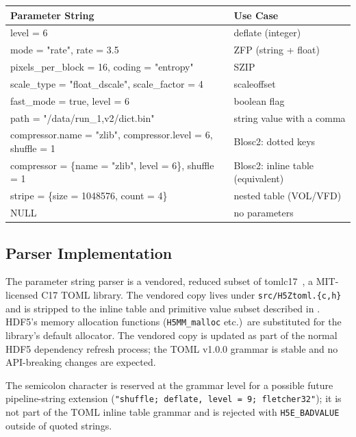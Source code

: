 \documentclass[../RFC-HDFG-2026-001.tex]{subfiles}
\begin{document}
\begin{center}
\begin{tabularx}{\textwidth}{>{\ttfamily\raggedright\arraybackslash\hsize=1.55\hsize}X
                             >{\raggedright\arraybackslash\hsize=0.45\hsize}X}
\toprule
\textbf{Parameter String} & \textbf{Use Case} \\
\midrule
level = 6 & deflate (integer) \\
mode = "rate", rate = 3.5 & ZFP (string + float) \\
pixels\_per\_block = 16, coding = "entropy" & SZIP \\
scale\_type = "float\_dscale", scale\_factor = 4 & scaleoffset \\
fast\_mode = true, level = 6 & boolean flag \\
path = "/data/run\_1,\allowbreak{}v2/dict.bin" & string value with a comma \\
compressor.name = "zlib",\allowbreak{} compressor.level = 6,\allowbreak{} shuffle = 1
  & Blosc2: dotted keys \\
compressor = \{name = "zlib",\allowbreak{} level = 6\},\allowbreak{} shuffle = 1
  & Blosc2: inline table (equivalent) \\
stripe = \{size = 1048576, count = 4\} & nested table (VOL/VFD) \\
NULL & no parameters \\
\bottomrule
\end{tabularx}
\end{center}

\subsection{Parser Implementation}
\label{sec:param-parser}

The parameter string parser is a vendored, reduced subset of
tomlc17~\cite{tomlc17}, a MIT-licensed C17 TOML library.  The vendored
copy lives under \texttt{src/H5Ztoml.\{c,h\}} and is stripped to the inline
table and primitive value subset described in .
HDF5's memory allocation functions (\texttt{H5MM\_malloc} etc.)\ are
substituted for the library's default allocator.  The vendored copy is
updated as part of the normal HDF5 dependency refresh process; the TOML
v1.0.0 grammar is stable and no API-breaking changes are expected.

The semicolon character is reserved at the grammar level for a possible
future pipeline-string extension (\texttt{"shuffle; deflate, level = 9;
fletcher32"}); it is not part of the TOML inline table grammar and is
rejected with \texttt{H5E\_BADVALUE} outside of quoted strings.
\end{document}
